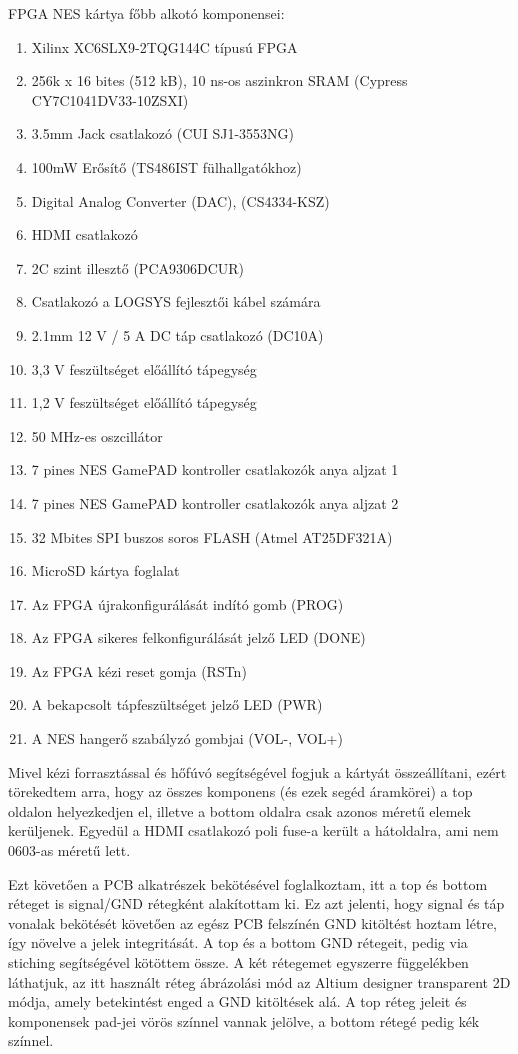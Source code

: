 	FPGA NES kártya főbb alkotó komponensei:
	\begin{enumerate}
		\item Xilinx XC6SLX9-2TQG144C típusú FPGA
		\item 256k x 16 bites (512 kB), 10 ns-os aszinkron SRAM (Cypress CY7C1041DV33-10ZSXI)
		\item 3.5mm Jack csatlakozó (CUI SJ1-3553NG)
		\item 100mW Erősítő (TS486IST fülhallgatókhoz)
		\item Digital Analog Converter (DAC), (CS4334-KSZ)
		\item HDMI csatlakozó
		\item 2C szint illesztő (PCA9306DCUR)
		\item Csatlakozó a LOGSYS fejlesztői kábel számára
		\item 2.1mm 12 V / 5 A DC táp csatlakozó (DC10A)
		\item 3,3 V feszültséget előállító tápegység
		\item 1,2 V feszültséget előállító tápegység
		\item 50 MHz-es oszcillátor 
		\item 7 pines NES GamePAD kontroller csatlakozók anya aljzat 1
		\item 7 pines NES GamePAD kontroller csatlakozók anya aljzat 2
		\item 32 Mbites SPI buszos soros FLASH (Atmel AT25DF321A)
		\item MicroSD kártya foglalat
		\item Az FPGA újrakonfigurálását indító gomb (PROG)
		\item Az FPGA sikeres felkonfigurálását jelző LED (DONE)
		\item Az FPGA kézi reset gomja (RSTn)
		\item A bekapcsolt tápfeszültséget jelző LED (PWR)
		\item A NES hangerő szabályzó gombjai (VOL-, VOL+)
	\end{enumerate}
	
	Mivel kézi forrasztással és hőfúvó segítségével fogjuk a kártyát összeállítani, ezért törekedtem arra, hogy az összes komponens (és ezek segéd áramkörei) a top oldalon helyezkedjen el, illetve a bottom oldalra csak azonos méretű elemek kerüljenek. Egyedül a HDMI csatlakozó poli fuse-a került a hátoldalra, ami nem 0603-as méretű lett.
	
	Ezt követően a PCB alkatrészek bekötésével foglalkoztam, itt a top és bottom réteget is signal/GND rétegként alakítottam ki. Ez azt jelenti, hogy signal és táp vonalak bekötését követően az egész PCB felszínén GND kitöltést hoztam létre, így növelve a jelek integritását. A top és a bottom GND rétegeit, pedig via stiching segítségével kötöttem össze. A két rétegemet egyszerre  függelékben láthatjuk, az itt használt réteg ábrázolási mód az Altium designer transparent 2D módja, amely betekintést enged a GND kitöltések alá. A top réteg jeleit és komponensek pad-jei vörös színnel vannak jelölve, a bottom rétegé pedig kék színnel.
	
